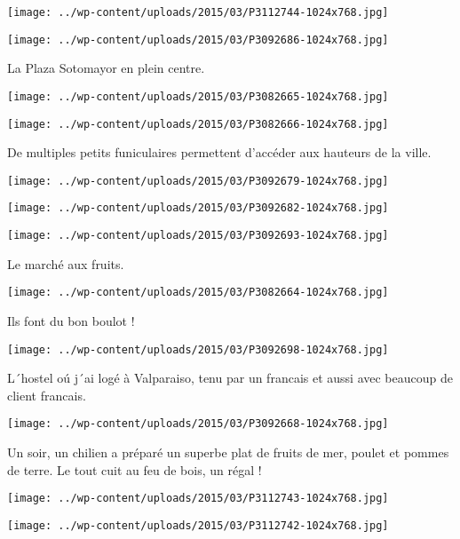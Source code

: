  \newline
\centerline{\texttt{[image: ../wp-content/uploads/2015/03/P3112744-1024x768.jpg]} } 
 \newline
\centerline{\texttt{[image: ../wp-content/uploads/2015/03/P3092686-1024x768.jpg]} } 
 \newline
 La Plaza Sotomayor en plein centre. \newline
 \newline
\centerline{\texttt{[image: ../wp-content/uploads/2015/03/P3082665-1024x768.jpg]} } 
 \newline
\centerline{\texttt{[image: ../wp-content/uploads/2015/03/P3082666-1024x768.jpg]} } 
 \newline
 De multiples petits funiculaires permettent d'accéder aux hauteurs de la ville. \newline
 \newline
\centerline{\texttt{[image: ../wp-content/uploads/2015/03/P3092679-1024x768.jpg]} } 
 \newline
\centerline{\texttt{[image: ../wp-content/uploads/2015/03/P3092682-1024x768.jpg]} } 
 \newline
\centerline{\texttt{[image: ../wp-content/uploads/2015/03/P3092693-1024x768.jpg]} } 
Le marché aux fruits. \newline
 \newline
\centerline{\texttt{[image: ../wp-content/uploads/2015/03/P3082664-1024x768.jpg]} } 
Ils font du bon boulot !\newline
\centerline{\texttt{[image: ../wp-content/uploads/2015/03/P3092698-1024x768.jpg]} } 
 \newline
 L´hostel oú j´ai logé à Valparaiso, tenu par un francais et aussi avec beaucoup de client francais. \newline
 \newline
\centerline{\texttt{[image: ../wp-content/uploads/2015/03/P3092668-1024x768.jpg]} } 
 \newline
 Un soir, un chilien a préparé un superbe plat de fruits de mer, poulet et pommes de terre. Le tout cuit au feu de bois, un régal ! \newline
 \newline
\centerline{\texttt{[image: ../wp-content/uploads/2015/03/P3112743-1024x768.jpg]} } 
 \newline
 \newline
\centerline{\texttt{[image: ../wp-content/uploads/2015/03/P3112742-1024x768.jpg]} } 
